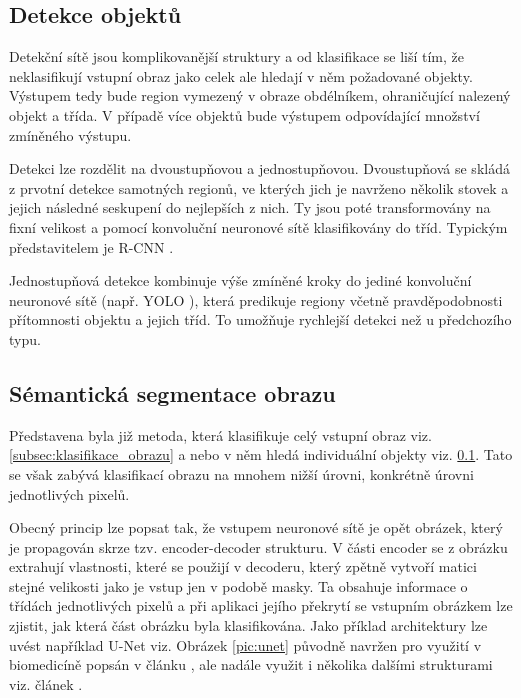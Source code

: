 \documentclass[czech, bc, kky, he, iso690numb]{fasthesis}
\begin{document}
           	\subsection{Detekce objektů}\label{subsec:detekce_objektu}
           		Detekční sítě jsou komplikovanější struktury a od klasifikace se liší tím, že neklasifikují vstupní obraz jako celek ale hledají v něm požadované objekty. Výstupem tedy bude region vymezený v obraze obdélníkem, ohraničující nalezený objekt a třída. V případě více objektů bude výstupem odpovídající množství zmíněného výstupu.
           		
           		Detekci lze rozdělit na dvoustupňovou a jednostupňovou. Dvoustupňová se skládá z prvotní detekce samotných regionů, ve kterých jich je navrženo několik stovek a jejich následné seskupení do nejlepších z nich. Ty jsou poté transformovány na fixní velikost a pomocí konvoluční neuronové sítě klasifikovány do tříd. Typickým představitelem je R-CNN \cite{R-CNN}.
           		
           		Jednostupňová detekce kombinuje výše zmíněné kroky do jediné konvoluční neuronové sítě (např. YOLO \cite{YOLO}), která predikuje regiony včetně pravděpodobnosti přítomnosti objektu a jejich tříd. To umožňuje rychlejší detekci než u předchozího typu.
           	
           	\subsection{Sémantická segmentace obrazu}
            	Představena byla již metoda, která klasifikuje celý vstupní obraz viz. \ref{subsec:klasifikace_obrazu} a nebo v něm hledá individuální objekty viz. \ref{subsec:detekce_objektu}. Tato se však zabývá klasifikací obrazu na mnohem nižší úrovni, konkrétně úrovni jednotlivých pixelů.
            	
            	Obecný princip lze popsat tak, že vstupem neuronové sítě je opět obrázek, který je propagován skrze tzv. encoder-decoder strukturu. V části encoder se z obrázku extrahují vlastnosti, které se použijí v decoderu, který zpětně vytvoří matici stejné velikosti jako je vstup jen v podobě masky. Ta obsahuje informace o třídách jednotlivých pixelů a při aplikaci jejího překrytí se vstupním obrázkem lze zjistit, jak která část obrázku byla klasifikována. Jako příklad architektury lze uvést například U-Net viz. Obrázek \ref{pic:unet} původně navržen pro využití v biomedicíně popsán v článku \cite{U-Net}, ale nadále využit i několika dalšími strukturami viz. článek \cite{semantic_segmentation_survey}.
            	
\end{document}
